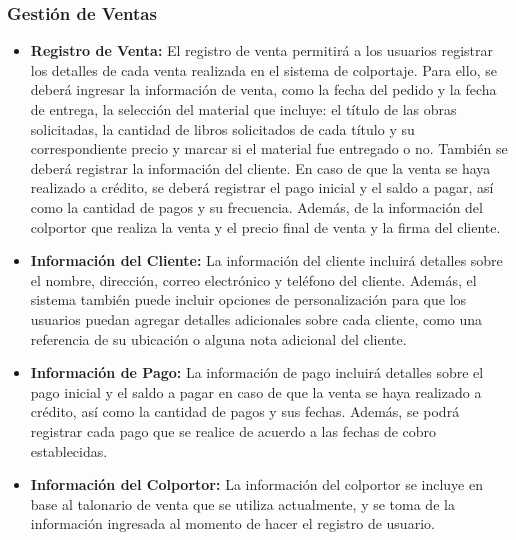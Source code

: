 \documentclass[runningheads]{llncs}
\begin{document}
                \subsubsection{Gestión de Ventas}
                    \begin{itemize}
                        \item \textbf{Registro de Venta: }El registro de venta permitirá a los usuarios registrar los detalles de cada venta realizada en el sistema de colportaje. Para ello, se deberá ingresar la información de venta, como la fecha del pedido y la fecha de entrega, la selección del material que incluye: el título de las obras solicitadas, la cantidad de libros solicitados de cada título y su correspondiente precio y marcar si el material fue entregado o no. También se deberá registrar la información del cliente. En caso de que la venta se haya realizado a crédito, se deberá registrar el pago inicial y el saldo a pagar, así como la cantidad de pagos y su frecuencia. Además, de la información del colportor que realiza la venta y el precio final de venta y la firma del cliente.
                        \item \textbf{Información del Cliente: }La información del cliente incluirá detalles sobre el nombre, dirección, correo electrónico y teléfono del cliente. Además, el sistema también puede incluir opciones de personalización para que los usuarios puedan agregar detalles adicionales sobre cada cliente, como una referencia de su ubicación o alguna nota adicional del cliente.
                        \item \textbf{Información de Pago: }La información de pago incluirá detalles sobre el pago inicial y el saldo a pagar en caso de que la venta se haya realizado a crédito, así como la cantidad de pagos y sus fechas. Además, se podrá registrar cada pago que se realice de acuerdo a las fechas de cobro establecidas.
                        \item \textbf{Información del Colportor: }La información del colportor se incluye en base al talonario de venta que se utiliza actualmente, y se toma de la información ingresada al momento de hacer el registro de usuario.
                    \end{itemize}   
\end{document}
